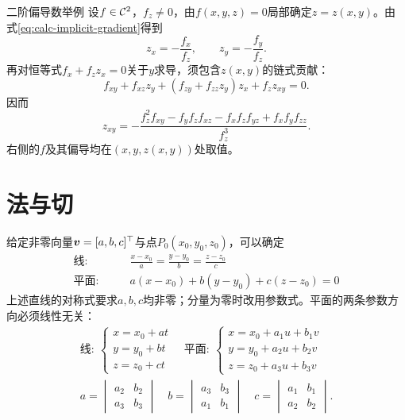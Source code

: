 \begin{example}{二阶偏导数举例}{}
    设$f \in \mathcal{C}^2$，$f_z \neq 0$，由$f(x,y,z) = 0$局部确定$z = z(x,y)$。由式\eqref{eq:calc-implicit-gradient}得到
    \[
        z_x = -\frac{f_x}{f_z},\qquad z_y = -\frac{f_y}{f_z}.
    \]
    再对恒等式$f_x + f_z z_x = 0$关于$y$求导，须包含$z(x,y)$的链式贡献：
    \[
        f_{xy} + f_{xz}z_y + (f_{zy} + f_{zz}z_y)z_x + f_z z_{xy} = 0.
    \]
    因而
    \begin{equation}\label{eq:calc-implicit-mixed-derivative}
        z_{xy} = -\frac{f_z^2f_{xy} - f_yf_zf_{xz} - f_xf_zf_{yz} + f_xf_yf_{zz}}{f_z^3}.
    \end{equation}
    右侧的$f$及其偏导均在$(x,y,z(x,y))$处取值。
\end{example}
\section{法与切}
给定非零向量$\bm v = [a,b,c]^\top$与点$P_0(x_0,y_0,z_0)$，可以确定
\begin{subequations}\label{eq:calc-line-plane-cartesian}
	\begin{align}
		\text{线}:   & \qquad \frac{x - x_0}a = \frac{y - y_0}b = \frac{z - z_0}c \\
		\text{平面}: & \qquad a(x - x_0) + b(y - y_0) + c(z - z_0) = 0
	\end{align}
\end{subequations}
上述直线的对称式要求$a,b,c$均非零；分量为零时改用参数式。平面的两条参数方向必须线性无关：
\begin{subequations}\label{eq:calc-line-plane-parametric}
	\begin{gather}
		\text{线}:~
		\begin{cases}
			x = x_0 + at \\[-1ex]
			y = y_0 + bt \\[-1ex]
			z = z_0 + ct
		\end{cases}
		\quad
		\text{平面}:~
		\begin{cases}
			x = x_0 + a_1u + b_1v \\[-1ex]
			y = y_0 + a_2u + b_2v \\[-1ex]
			z = z_0 + a_3u + b_3v
		\end{cases}
		\\
		a =
		\begin{vmatrix}
			a_2 & b_2 \\
			a_3 & b_3
		\end{vmatrix}\quad b =
		\begin{vmatrix}
			a_3 & b_3 \\
			a_1 & b_1
		\end{vmatrix}\quad c =
		\begin{vmatrix}
			a_1 & b_1 \\
			a_2 & b_2
		\end{vmatrix}.
	\end{gather}
\end{subequations}

